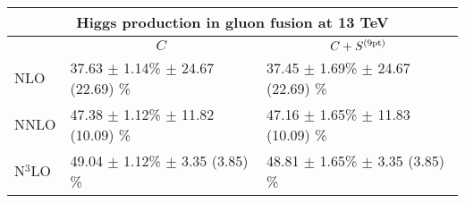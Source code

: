   \renewcommand*{\arraystretch}{1.7}
\begin{tabular}{l l l}
\multicolumn{3}{c}{Higgs production in gluon fusion at 13 TeV }\\
\toprule
           & \multicolumn{1}{c}{$C$} & \multicolumn{1}{c}{$C+S^{(\rm 9pt)}$} \\
\midrule
 NLO & 37.63 $\pm$  1.14\% $\pm$ 24.67 (22.69) \%  & 37.45 $\pm$  1.69\% $\pm$ 24.67 (22.69) \% \\
NNLO & 47.38 $\pm$  1.12\% $\pm$ 11.82 (10.09) \%
   & 47.16 $\pm$  1.65\% $\pm$ 11.83 (10.09) \% \\
N$^3$LO & 49.04 $\pm$  1.12\% $\pm$ 3.35 (3.85) \%
   & 48.81 $\pm$  1.65\% $\pm$ 3.35 (3.85) \% \\
\bottomrule
\end{tabular}

